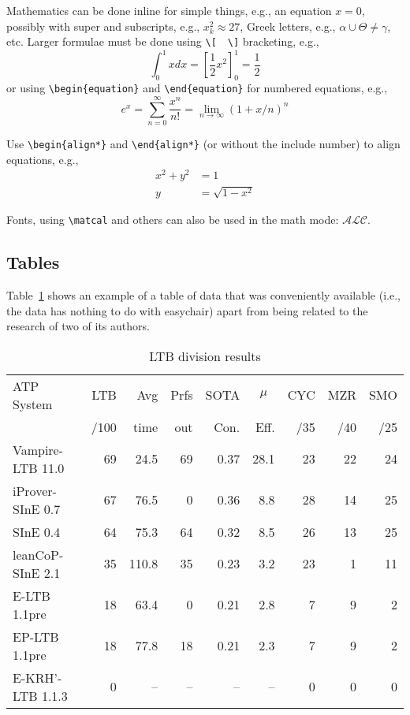 \documentclass[withtimes]{easychair}
\newcommand{\easychair}{\textsf{easychair}}
\begin{document}
Mathematics can be done inline for simple things, e.g., an equation
$x = 0$, possibly with super and subscripts, e.g., $x^2_k \approx 27$,
Greek letters, e.g., $\alpha \cup \Theta \ne \gamma$, etc.
Larger formulae must be done using {\tt \verb|\|[}~~{\tt \verb|\|]}
bracketing, e.g.,
\[
\int_{0}^{1} x dx = \left[ \frac{1}{2}x^2 \right]_{0}^{1} = \frac{1}{2}
\]
or using {\tt \verb|\|begin\{equation\}} and {\tt \verb|\|end\{equation\}} for
numbered equations, e.g.,
\begin{equation}
e^x = \sum_{n=0}^\infty \frac{x^n}{n!} = \lim_{n\rightarrow\infty} (1+x/n)^n
\end{equation}

Use {\tt \verb|\|begin\{align*\}} and {\tt \verb|\|end\{align*\}} (or without
the {\tt *} include number) to align equations, e.g.,
\begin{align*}
x^2 + y^2 &= 1 \\
y &= \sqrt{1 - x^2}
\end{align*}

Fonts, using \verb|\matcal| and others can also be used in the math mode: $\mathcal{ALC}$.

\subsection{Tables}
\label{sect:tables}

Table~\ref{tab:ltbexample} shows an example of a table of data that was
conveniently available (i.e., the data has nothing to do with
{\easychair}) apart from being related to the research of two of its
authors. 

\begin{table}[htp]
	\begin{centering}
		\begin{tabular}{lrrrrrrrr}
		\hline
		ATP System            & LTB & Avg  &Prfs & SOTA & \multicolumn{1}{c}{$\mu$} & CYC & MZR & SMO \\
		                      & /100& time & out & Con. & Eff. & /35 & /40 & /25 \\
		\hline
		Vampire-LTB 11.0      &  69 & 24.5 &  69 & 0.37 & 28.1 &  23 &  22 &  24 \\
		iProver-SInE 0.7      &  67 & 76.5 &   0 & 0.36 &  8.8 &  28 &  14 &  25 \\
		SInE 0.4              &  64 & 75.3 &  64 & 0.32 &  8.5 &  26 &  13 &  25 \\
		leanCoP-SInE 2.1      &  35 &110.8 &  35 & 0.23 &  3.2 &  23 &   1 &  11 \\
		E-LTB 1.1pre          &  18 & 63.4 &   0 & 0.21 &  2.8 &   7 &   9 &   2 \\
		EP-LTB 1.1pre         &  18 & 77.8 &  18 & 0.21 &  2.3 &   7 &   9 &   2 \\
		E-KRH'-LTB 1.1.3      &   0 &   -- &  -- &   -- &   -- &   0 &   0 &   0 \\
		\hline
		\end{tabular}
		\caption{LTB division results}
		\label{tab:ltbexample}
	\end{centering}
\end{table}
\end{document}
